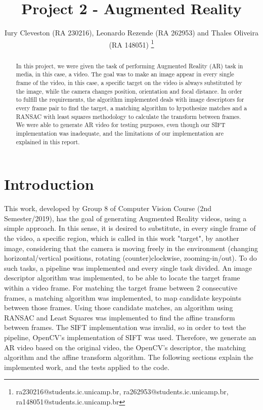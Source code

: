 \documentclass[]{IEEEtran}
\begin{document}
  \title{Project 2 - Augmented Reality}
  \author{Iury Cleveston (RA 230216), Leonardo Rezende (RA 262953) and Thales Oliveira (RA 148051)
    \thanks{ra230216@students.ic.unicamp.br, ra262953@students.ic.unicamp.br, ra148051@students.ic.unicamp.br}
  }
  \maketitle
  
  \begin{abstract}
    In this project, we were given the task of performing Augmented Reality (AR) task in media, in this case, a video. The goal was to make an image appear in every single frame of the video, in this case, a specific target on the video is always substituted by the image, while the camera changes position, orientation and focal distance. In order to fulfill the requirements, the algorithm implemented deals with image descriptors for every frame pair to find the target, a matching algorithm to hypothesize matches and a RANSAC with least squares methodology to calculate the transform between frames. We were able to generate AR video for testing purposes, even though our SIFT implementation was inadequate, and the limitations of our implementation are explained in this report.
  \end{abstract}
  
\section{Introduction}
This work, developed by Group 8 of Computer Vision Course (2nd Semester/2019), has the goal of generating Augmented Reality videos, using a simple approach. In this sense, it is desired to substitute, in every single frame of the video, a specific region, which is called in this work "target", by another image, considering that the camera is moving freely in the environment (changing horizontal/vertical positions, rotating (counter)clockwise, zooming-in/out). To do such tasks, a pipeline was implemented and every single task divided. An image descriptor algorithm was implemented, to be able to locate the target frame within a video frame. For matching the target frame between 2 consecutive frames, a matching algorithm was implemented, to map candidate keypoints between those frames. Using those candidate matches, an algorithm using RANSAC and Least Squares was implemented to find the affine transform between frames. The SIFT implementation was invalid, so in order to test the pipeline, OpenCV's implementation of SIFT was used. Therefore, we generate an AR video based on the original video, the OpenCV's descriptor, the matching algorithm and the affine transform algorithm. The following sections explain the implemented work, and the tests applied to the code.  
\end{document}
